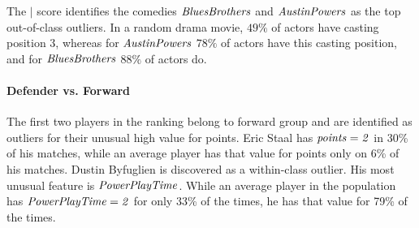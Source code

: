 {							%
							The  $\mid$ score identifies the comedies  $\it{Blues Brothers}$ and $\it{Austin Powers}$ as the top out-of-class outliers. 
							In a random drama movie,  $49\%$ of actors have casting position 3, whereas for $\it{Austin Powers}$ $78\%$ of actors have this casting position, and for $\it{Blues Brothers}$ $88\%$ of actors do. 
     						\paragraph{Defender vs. Forward}
     						The first two players in the ranking belong to forward group and are identified as outliers for their unusual high value for points. Eric Staal has $\it{points=2}$ in 30\% of his matches, while an average player has that value for points only on 6\% of his matches. Dustin Byfuglien is discovered as a within-class outlier. His most unusual feature is $\it{Power Play Time}$. While an average player in the population has  $\it{Power Play Time=2}$ for only 33\% of the times, he has that value for 79\% of the times.
}
